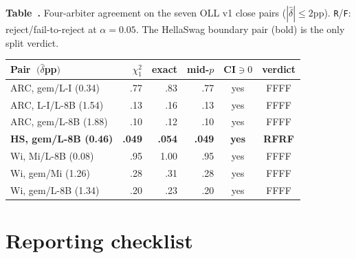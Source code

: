 \documentclass{article}
\theoremstyle{plain}
\theoremstyle{definition}
\begin{document}
\label{tab:arbiters}%
\begin{center}\footnotesize\vspace{-1ex}
\textbf{Table~\thetable.} Four-arbiter agreement on the seven OLL v1 close pairs ($|\hat\delta|\leq 2$pp). \texttt{R}/\texttt{F}: reject/fail-to-reject at $\alpha{=}0.05$. The HellaSwag boundary pair (bold) is the only split verdict.\\[3pt]
\setlength{\tabcolsep}{4pt}
\begin{tabular}{@{}lrrrcc@{}}
\toprule
Pair $\ (\hat\delta$pp$)$ & $\chi^2_1$ & exact & mid-$p$ & CI$\ni 0$ & verdict \\
\midrule
ARC, gem/L-I (0.34)        & .77  & .83  & .77  & yes & FFFF \\
ARC, L-I/L-8B (1.54)       & .13  & .16  & .13  & yes & FFFF \\
ARC, gem/L-8B (1.88)       & .10  & .12  & .10  & yes & FFFF \\
\textbf{HS, gem/L-8B (0.46)} & \textbf{.049} & \textbf{.054} & \textbf{.049} & \textbf{yes} & \textbf{RFRF} \\
Wi, Mi/L-8B (0.08)         & .95  & 1.00 & .95  & yes & FFFF \\
Wi, gem/Mi (1.26)          & .28  & .31  & .28  & yes & FFFF \\
Wi, gem/L-8B (1.34)        & .20  & .23  & .20  & yes & FFFF \\
\bottomrule
\end{tabular}
\end{center}

\section{Reporting checklist}
\label{sec:checklist}
\end{document}
